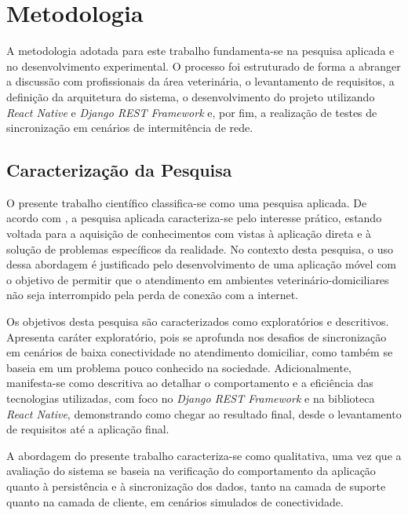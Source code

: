 \chapter{Metodologia}
\label{chap:metodologia}


A metodologia adotada para este trabalho fundamenta-se na pesquisa aplicada e no desenvolvimento experimental. O processo foi estruturado de forma a abranger a discussão com profissionais da área veterinária, o levantamento de requisitos, a definição da arquitetura do sistema, o desenvolvimento do projeto utilizando \textit{React Native} e \textit{Django REST Framework} e, por fim, a realização de testes de sincronização em cenários de intermitência de rede.

\section{Caracterização da Pesquisa}

O presente trabalho científico classifica-se como uma pesquisa aplicada. De acordo com , a pesquisa aplicada caracteriza-se pelo interesse prático, estando voltada para a aquisição de conhecimentos com vistas à aplicação direta e à solução de problemas específicos da realidade. No contexto desta pesquisa, o uso dessa abordagem é justificado pelo desenvolvimento de uma aplicação móvel com o objetivo de permitir que o atendimento em ambientes veterinário-domiciliares não seja interrompido pela perda de conexão com a internet.

Os objetivos desta pesquisa são caracterizados como exploratórios e descritivos. Apresenta caráter exploratório, pois se aprofunda nos desafios de sincronização em cenários de baixa conectividade no atendimento domiciliar, como também se baseia em um problema pouco conhecido na sociedade. Adicionalmente, manifesta-se como descritiva ao detalhar o comportamento e a eficiência das tecnologias utilizadas, com foco no \textit{Django REST Framework} e na biblioteca \textit{React Native}, demonstrando como chegar ao resultado final, desde o levantamento de requisitos até a aplicação final.

A abordagem do presente trabalho caracteriza-se como qualitativa, uma vez que a avaliação do sistema se baseia na verificação do comportamento da aplicação quanto à persistência e à sincronização dos dados, tanto na camada de suporte quanto na camada de cliente, em cenários simulados de conectividade.

